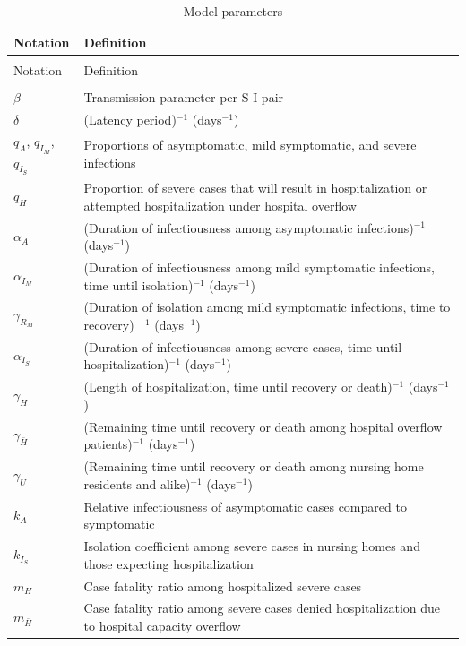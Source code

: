 \documentclass[11pt]{article}
\begin{document}
\begin{spacing}{1}
\begin{longtable}[H] {p{} p{} }
	\caption{Model parameters} \\
	Notation & Definition \\[0.5em] \hline
	{} & {} \\
	\endfirsthead
	Notation & Definition  \\[0.5em] \hline
	\endhead
	{} & {}  \\[-1em]
	$\beta$ & Transmission parameter per S-I pair \\[0.5em]
	$\delta$ & (Latency period)$^{-1}$ (days$^{-1}$) \\[0.5em]
	$q_A$, $q_{I_M}$, $q_{I_S}$  & Proportions of asymptomatic, mild symptomatic, and severe infections \\[0.5em]
	$q_H$ & Proportion of severe cases that will result in hospitalization or attempted hospitalization under hospital overflow \\ [0.5em]
	$\alpha_A$ & (Duration of infectiousness among asymptomatic infections)$^{-1}$ (days$^{-1}$) \\[0.5em]	
	$\alpha_{I_M}$ & (Duration of infectiousness among mild symptomatic infections, time until isolation)$^{-1}$ (days$^{-1}$) \\[0.5em]
	$\gamma_{R_M}$ & (Duration of isolation among mild symptomatic infections, time to recovery)	$^{-1}$ (days$^{-1}$) \\[0.5em]
	$\alpha_{I_S}$ & (Duration of infectiousness among severe cases, time until hospitalization)$^{-1}$ (days$^{-1}$) \\[0.5em]	
	$\gamma_{H}$ & (Length of hospitalization, time until recovery or death)$^{-1}$ (days$^{-1}$) \\[0.5em]
	$\gamma_{\bar{H}}$ & (Remaining time until recovery or death among hospital overflow patients)$^{-1}$ (days$^{-1}$) \\[0.5em]
	$\gamma_{U}$ & (Remaining time until recovery or death among nursing home residents and alike)$^{-1}$ (days$^{-1}$) \\[0.5em]
	$k_A$ & Relative infectiousness of asymptomatic cases compared to symptomatic \\[0.5em]
	$k_{I_S}$ & Isolation coefficient among severe cases in nursing homes and those expecting hospitalization \\[0.5em]
	$m_H$ & Case fatality ratio among hospitalized severe cases \\[0.5em]
	$m_{\bar{H}}$ & Case fatality ratio among severe cases denied hospitalization due to hospital capacity overflow \\[0.5em]

\end{longtable}
\end{spacing}
\end{document}
